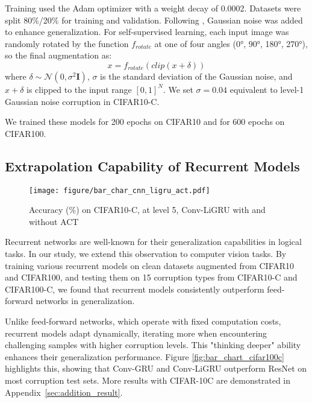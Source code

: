 Training used the Adam optimizer \citep{adam} with a weight decay of 0.0002. 
Datasets were split 80\%/20\% for training and validation. 
Following \citet{aug_cifarc}, Gaussian noise  was added to enhance generalization. For self-supervised learning,  each input image was randomly rotated by the function $f_{rotate}$ at one of four angles (0°, 90°, 180°, 270°), so the final augmentation as: 
\begin{equation}
    x = f_{rotate}(clip(x + \delta))
\end{equation}
where $\delta \sim \mathcal{N}(0, \sigma^2 \mathbf{I})$, $\sigma$ is the standard deviation of the Gaussian noise, and $x + \delta$ is clipped to the input range $[0, 1]^N$. We set $\sigma = 0.04$ equivalent to level-1 Gaussian noise corruption in CIFAR10-C.

We trained these models for 200 epochs on CIFAR10 and for 600 epochs on CIFAR100.  

\subsection{Extrapolation Capability of Recurrent Models}
\begin{figure}[t!]   
    \centering
    \texttt{[image: figure/bar\_char\_cnn\_ligru\_act.pdf]}
        \caption{Accuracy (\%) on CIFAR10-C, at level 5, Conv-LiGRU with and without ACT}
        \label{fig:bar_chart_act_ligru}
\end{figure}
Recurrent networks are well-known for their generalization capabilities in logical tasks. 
In our study, we extend this observation to computer vision tasks. 
By training various recurrent models on clean datasets augmented from CIFAR10 and CIFAR100, and testing them on 15 corruption types from CIFAR10-C and CIFAR100-C, we found that recurrent models consistently outperform feed-forward networks in generalization. 

Unlike feed-forward networks, which operate with fixed computation costs, recurrent models adapt dynamically, iterating more when encountering challenging samples with higher corruption levels. 
This "thinking deeper" ability enhances their generalization performance. 
Figure \ref{fig:bar_chart_cifar100c} highlights this, showing that Conv-GRU and Conv-LiGRU outperform ResNet on most corruption test sets.
More results with CIFAR-10C are demonstrated in Appendix~\ref{sec:addition_result}.

